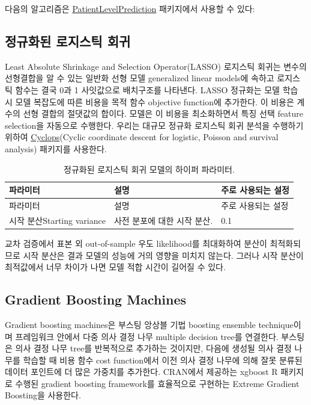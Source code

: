 \documentclass[10.5pt]{book}
\theoremstyle{definition}
\theoremstyle{definition}
\theoremstyle{definition}
\theoremstyle{remark}
\begin{document}
다음의 알고리즘은
\href{https://ohdsi.github.io/PatientLevelPrediction/}{PatientLevelPrediction}
패키지에서 사용할 수 있다:

\subsection{정규화된 로지스틱 회귀}\label{--}

Least Absolute Shrinkage and Selection Operator(LASSO) 로지스틱 회귀는
변수의 선형결합을 알 수 있는 일반화 선형 모델 generalized linear
models에 속하고 로지스틱 함수는 결국 0과 1 사잇값으로 배치구조를
나타낸다. LASSO 정규화는 모델 학습 시 모델 복잡도에 따른 비용을 목적
함수 objective function에 추가한다. 이 비용은 계수의 선형 결합의
절댓값의 합이다. 모델은 이 비용을 최소화하면서 특징 선택 feature
selection을 자동으로 수행한다. 우리는 대규모 정규화 로지스틱 회귀 분석을
수행하기 위하여 \href{https://ohdsi.github.io/Cyclops/}{Cyclops}(Cyclic
coordinate descent for logistic, Poisson and survival analysis) 패키지를
사용한다.  
 

\begin{longtable}[]{@{}lll@{}}
\caption{\label{tab:lassoParameters} 정규화된 로지스틱 회귀 모델의 하이퍼
파라미터.}\tabularnewline
\toprule
파라미터 & 설명 & 주로 사용되는 설정\tabularnewline
\midrule
\endfirsthead
\toprule
파라미터 & 설명 & 주로 사용되는 설정\tabularnewline
\midrule
\endhead
시작 분산Starting variance & 사전 분포에 대한 시작 분산. &
0.1\tabularnewline
\bottomrule
\end{longtable}

교차 검증에서 표본 외 out-of-sample 우도 likelihood를 최대화하여 분산이
최적화되므로 시작 분산은 결과 모델의 성능에 거의 영향을 미치지 않는다.
그러나 시작 분산이 최적값에서 너무 차이가 나면 모델 적합 시간이 길어질
수 있다.  

\subsection{Gradient Boosting
Machines}\label{gradient-boosting-machines}

Gradient boosting machines은 부스팅 앙상블 기법 boosting ensemble
technique이며 프레임워크 안에서 다중 의사 결정 나무 multiple decision
tree를 연결한다. 부스팅은 의사 결정 나무 tree를 반복적으로 추가하는
것이지만, 다음에 생성될 의사 결정 나무를 학습할 때 비용 함수 cost
function에서 이전 의사 결정 나무에 의해 잘못 분류된 데이터 포인트에 더
많은 가중치를 추가한다. CRAN에서 제공하는 xgboost R 패키지로 수행된
gradient boosting framework를 효율적으로 구현하는 Extreme Gradient
Boosting을 사용한다.  
\end{document}
